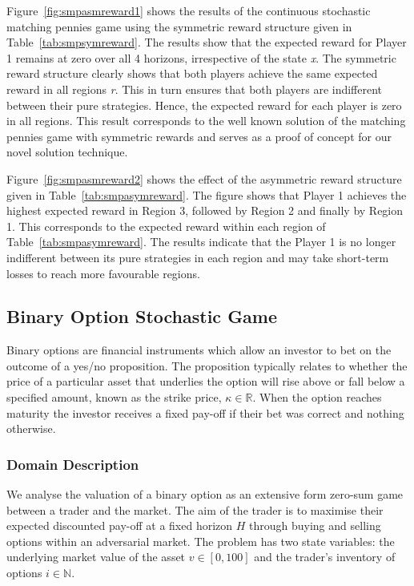 Figure~\eqref{fig:smpasmreward1} shows the results of the continuous
stochastic matching pennies game using the symmetric reward structure
given in Table~\ref{tab:smpsymreward}. The results show that the expected 
reward for Player 1 remains at zero over all 4 horizons, irrespective of the state \textit{x}. 
The symmetric reward structure clearly shows that both players achieve
the same expected reward in all regions \textit{r}. This in turn ensures that
both players are indifferent between their pure strategies. Hence, the expected reward 
for each player is zero in all regions. This result corresponds to the well known solution of the 
matching pennies game with symmetric rewards and serves as a proof of concept for 
our novel solution technique.

Figure~\eqref{fig:smpasmreward2} shows the effect of the asymmetric reward structure given in
Table~\ref{tab:smpasymreward}. The figure shows that Player 1 achieves the highest expected
reward in Region 3, followed by Region 2 and finally by Region 1. This corresponds
to the expected reward within each region of Table~\ref{tab:smpasymreward}. The results indicate 
that the Player 1 is no longer indifferent between its pure strategies in each region and may take short-term
losses to reach more favourable regions.

\subsection{Binary Option Stochastic Game}

Binary options are financial instruments which allow an investor to
bet on the outcome of a yes/no proposition. The proposition typically
relates to whether the price of a particular asset that underlies the option
will rise above or fall below a specified amount, known as the strike
price, $\kappa \in \mathbb{R}$. When the option reaches maturity the 
investor receives a fixed pay-off if their bet was correct and nothing otherwise.

\vspace{-1mm}

\subsubsection{Domain Description}

We analyse the valuation of a binary option as an extensive form
zero-sum game between a trader and the market. The aim of the trader
is to maximise their expected discounted pay-off at a fixed horizon $H$ 
through buying and selling options within an adversarial market. 
The problem has two state variables: the underlying market value of the asset
$v \in [0, 100]$ and the trader's inventory of options $i \in \mathbb{N}$.

